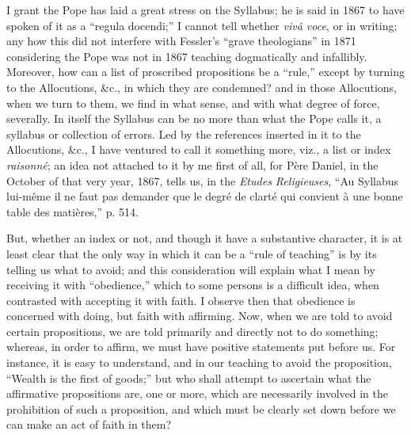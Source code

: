 I grant the Pope has laid a great stress on the Syllabus; he is said
in 1867 to have spoken of it as a ``regula docendi;'' I cannot
tell whether \emph{vivâ voce}, or in writing; any how this did not
interfere with Fessler's ``grave theologians'' in 1871
considering the Pope was not in 1867 teaching dogmatically and
infallibly. Moreover, how can a list of proscribed propositions be a
``rule,'' except by turning to the Allocutions, \&c., in
which they are condemned? and in those Allocutions, when we turn to
them, we find in what sense, and with what degree of force, severally.
In itself the Syllabus can be no more than what the Pope calls it, a
syllabus or collection of errors. Led by the references inserted in it
to the Allocutions, \&c., I have ventured to call it something more,
viz., a list or index \emph{raisonné}; an idea not attached to it by me
first of all, for Père Daniel, in the October of that very year, 1867,
tells us, in the \emph{Etudes Religieuses}, ``Au Syllabus lui-même
il ne faut pas demander que le degré de clarté qui convient à une
bonne table des matières,'' p. 514.

But, whether an index or not, and though it have a substantive
character, it is at least clear that the only way in which it can be a
``rule of teaching'' is by its telling us what to avoid; and
this consideration will explain what I mean by receiving it with
``obedience,'' which to some persons is a difficult idea, when
contrasted with accepting it with faith. I observe then that obedience
is concerned with doing, but faith with affirming. Now, when we are told
to avoid certain propositions, we are told primarily and directly not to
do something; whereas, in order to affirm, we must have positive
statements put before us. For instance, it is easy to understand, and in
our teaching to avoid the proposition, ``Wealth is the first of
goods;'' but who shall attempt to ascertain what the affirmative
propositions are, one or more, which are necessarily involved in
the prohibition of such a proposition, and which must be clearly set
down before we can make an act of faith in them?

